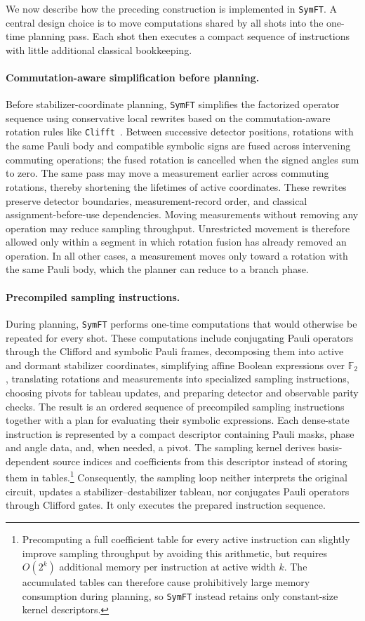 \documentclass[a4paper,onecolumn,unpublished]{quantumarticle}
\newcommand{\tFont}[1]{\texttt{#1}}
\newcommand{\symft}{\tFont{SymFT}}
\newcommand{\clifft}{\tFont{Clifft}}
\newcommand{\FF}{\mathbb{F}}
\begin{document}
We now describe how the preceding construction is implemented in \symft{}.
A central design choice is to move computations shared by all shots into the one-time planning pass.
Each shot then executes a compact sequence of instructions with little additional classical bookkeeping.

\paragraph{Commutation-aware simplification before planning.}
Before stabilizer-coordinate planning, \symft{} simplifies the factorized operator sequence using conservative local rewrites based on the commutation-aware rotation rules like \clifft{}~\cite{CL26}.
Between successive detector positions, rotations with the same Pauli body and compatible symbolic signs are fused across intervening commuting operations; the fused rotation is cancelled when the signed angles sum to zero.
The same pass may move a measurement earlier across commuting rotations, thereby shortening the lifetimes of active coordinates.
These rewrites preserve detector boundaries, measurement-record order, and classical assignment-before-use dependencies.
Moving measurements without removing any operation may reduce sampling throughput.
Unrestricted movement is therefore allowed only within a segment in which rotation fusion has already removed an operation.
In all other cases, a measurement moves only toward a rotation with the same Pauli body, which the planner can reduce to a branch phase.

\paragraph{Precompiled sampling instructions.}
During planning, \symft{} performs one-time computations that would otherwise be repeated for every shot.
These computations include conjugating Pauli operators through the Clifford and symbolic Pauli frames, decomposing them into active and dormant stabilizer coordinates, simplifying affine Boolean expressions over $\FF_2$, translating rotations and measurements into specialized sampling instructions, choosing pivots for tableau updates, and preparing detector and observable parity checks.
The result is an ordered sequence of precompiled sampling instructions together with a plan for evaluating their symbolic expressions.
Each dense-state instruction is represented by a compact descriptor containing Pauli masks, phase and angle data, and, when needed, a pivot.
The sampling kernel derives basis-dependent source indices and coefficients from this descriptor instead of storing them in tables.\footnote{Precomputing a full coefficient table for every active instruction can slightly improve sampling throughput by avoiding this arithmetic, but requires $O(2^k)$ additional memory per instruction at active width $k$.  The accumulated tables can therefore cause prohibitively large memory consumption during planning, so \symft{} instead retains only constant-size kernel descriptors.}
Consequently, the sampling loop neither interprets the original circuit, updates a stabilizer--destabilizer tableau, nor conjugates Pauli operators through Clifford gates.
It only executes the prepared instruction sequence.
\end{document}
